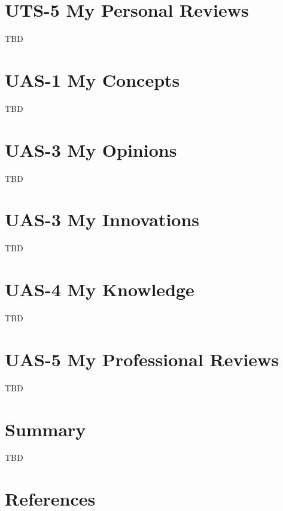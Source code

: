 \documentclass[
  letterpaper,
  DIV=11,
  numbers=noendperiod]{scrreprt}
\begin{document}

\chapter{UTS-5 My Personal Reviews}\label{uts-5-my-personal-reviews}

TBD


\chapter{UAS-1 My Concepts}\label{uas-1-my-concepts}

TBD


\chapter{UAS-3 My Opinions}\label{uas-3-my-opinions}

TBD


\chapter{UAS-3 My Innovations}\label{uas-3-my-innovations}

TBD


\chapter{UAS-4 My Knowledge}\label{uas-4-my-knowledge}

TBD


\chapter{UAS-5 My Professional
Reviews}\label{uas-5-my-professional-reviews}

TBD


\chapter{Summary}\label{summary}

TBD


\chapter*{References}\label{references}


\label{refs}
\end{document}
